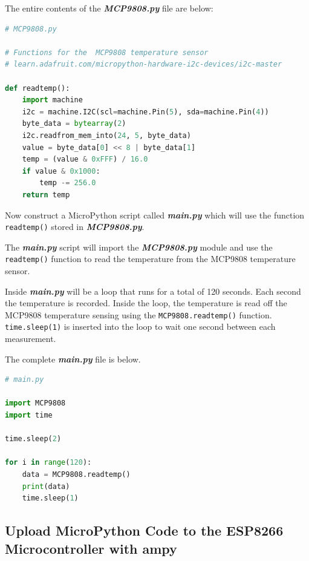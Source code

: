 \documentclass{book}
\begin{document}
    
        The entire contents of the \textbf{\emph{MCP9808.py}} file are below:

\begin{lstlisting}[language=Python]
# MCP9808.py

# Functions for the  MCP9808 temperature sensor
# learn.adafruit.com/micropython-hardware-i2c-devices/i2c-master

def readtemp():
    import machine
    i2c = machine.I2C(scl=machine.Pin(5), sda=machine.Pin(4))
    byte_data = bytearray(2)
    i2c.readfrom_mem_into(24, 5, byte_data)
    value = byte_data[0] << 8 | byte_data[1]
    temp = (value & 0xFFF) / 16.0
    if value & 0x1000:
        temp -= 256.0
    return temp
\end{lstlisting}
    




    
        Now construct a MicroPython script called \textbf{\emph{main.py}} which
will use the function \lstinline!readtemp()! stored in
\textbf{\emph{MCP9808.py}}.

The \textbf{\emph{main.py}} script will import the
\textbf{\emph{MCP9808.py}} module and use the \lstinline!readtemp()!
function to read the temperature from the MCP9808 temperature sensor.

Inside \textbf{\emph{main.py}} will be a loop that runs for a total of
120 seconds. Each second the temperature is recorded. Inside the loop,
the temperature is read off the MCP9808 temperature sensing using the
\lstinline!MCP9808.readtemp()! function. \lstinline!time.sleep(1)! is
inserted into the loop to wait one second between each measurement.

The complete \textbf{\emph{main.py}} file is below.

\begin{lstlisting}[language=Python]
# main.py

import MCP9808
import time

time.sleep(2)

for i in range(120):
    data = MCP9808.readtemp()
    print(data)
    time.sleep(1)
\end{lstlisting}
    




    
        \subsection{\texorpdfstring{Upload MicroPython Code to the ESP8266
Microcontroller with
\textbf{ampy}}{Upload MicroPython Code to the ESP8266 Microcontroller with ampy}}\label{upload-micropython-code-to-the-esp8266-microcontroller-with-ampy}
    
\end{document}
